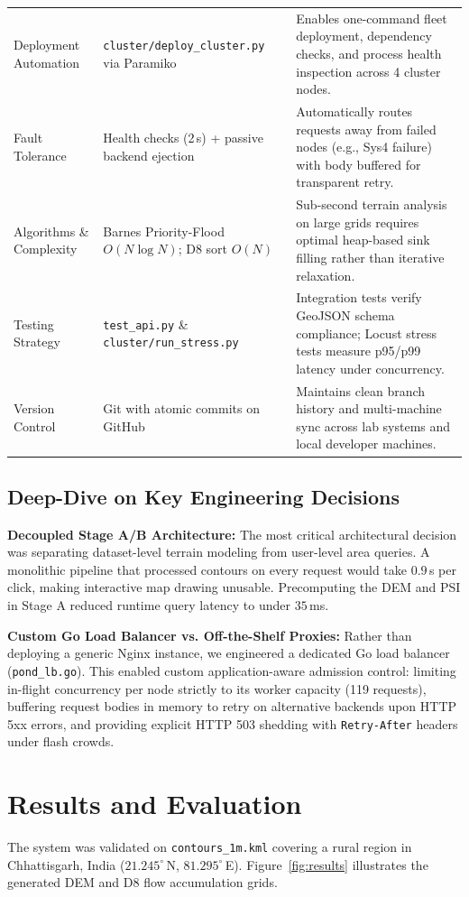\documentclass[manuscript,screen,review]{acmart}
\begin{document}
\begin{table}[t]
\begin{tabular}{p{3.2cm}p{5.5cm}p{6.5cm}}
    Deployment Automation & \texttt{cluster/deploy\_cluster.py} via Paramiko & Enables one-command fleet deployment, dependency checks, and process health inspection across 4 cluster nodes. \\
    Fault Tolerance & Health checks (2\,s) + passive backend ejection & Automatically routes requests away from failed nodes (e.g., Sys4 failure) with body buffered for transparent retry. \\
    Algorithms \& Complexity & Barnes Priority-Flood $O(N \log N)$; D8 sort $O(N)$ & Sub-second terrain analysis on large grids requires optimal heap-based sink filling rather than iterative relaxation. \\
    Testing Strategy & \texttt{test\_api.py} \& \texttt{cluster/run\_stress.py} & Integration tests verify GeoJSON schema compliance; Locust stress tests measure p95/p99 latency under concurrency. \\
    Version Control & Git with atomic commits on GitHub & Maintains clean branch history and multi-machine sync across lab systems and local developer machines. \\
    \bottomrule
  \end{tabular}
\end{table}

\subsection{Deep-Dive on Key Engineering Decisions}
\textbf{Decoupled Stage A/B Architecture:} The most critical architectural decision was separating dataset-level terrain modeling from user-level area queries. A monolithic pipeline that processed contours on every request would take $0.9$\,s per click, making interactive map drawing unusable. Precomputing the DEM and PSI in Stage A reduced runtime query latency to under $35$\,ms.

\textbf{Custom Go Load Balancer vs. Off-the-Shelf Proxies:} Rather than deploying a generic Nginx instance, we engineered a dedicated Go load balancer (\texttt{pond\_lb.go}). This enabled custom application-aware admission control: limiting in-flight concurrency per node strictly to its worker capacity (119 requests), buffering request bodies in memory to retry on alternative backends upon HTTP 5xx errors, and providing explicit HTTP 503 shedding with \texttt{Retry-After} headers under flash crowds.

\section{Results and Evaluation}
\label{sec:results}
The system was validated on \texttt{contours\_1m.kml} covering a rural region in Chhattisgarh, India ($21.245^\circ$\,N, $81.295^\circ$\,E). Figure~\ref{fig:results} illustrates the generated DEM and D8 flow accumulation grids.
\end{document}
